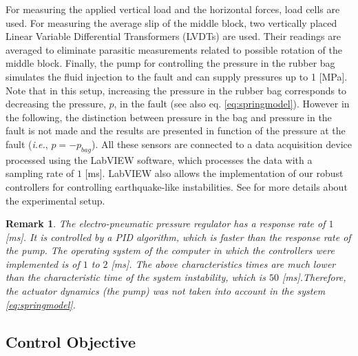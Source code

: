 \documentclass[journal,twoside,web]{ieeecolor}
\newtheorem{remark}{Remark}
\begin{document}
For measuring the applied vertical load and the horizontal forces, load cells are used. For measuring the average slip of the middle block, two vertically placed Linear Variable Differential Transformers (LVDTs) are used. Their readings are averaged to eliminate parasitic measurements related to possible rotation of the middle block. Finally, the pump for controlling the pressure in the rubber bag simulates the fluid injection to the fault and can supply pressures up to 1 [MPa]. Note that in this setup, increasing the pressure in the rubber bag corresponds to decreasing the pressure, $p$, in the fault (see also eq. \eqref{eq:springmodel}). However in the following, the distinction between pressure in the bag and pressure in the fault is not made and the results are presented in function of the pressure at the fault (\textit{i.e.}, $p=-p_{bag}$). All these sensors are connected to a data acquisition device processed using the LabVIEW software, which processes the data with a sampling rate of $1$ [ms]. LabVIEW also allows the implementation of our robust controllers for controlling earthquake-like instabilities. See \cite[Chapter 5]{b:Tzortzopoulos-2021} for more details about the experimental setup.

\begin{remark}
The electro-pneumatic pressure regulator has a response rate of $1$ [ms]. It is controlled by a PID algorithm, which is faster than the response rate of the pump. The operating system of the computer in which the controllers were implemented is of $1$ to $2$ [ms]. The above characteristics times are much lower than the characteristic time of the system instability, which is $50$ [ms].Therefore, the actuator dynamics (the pump) was not taken into account in the system \eqref{eq:springmodel}.
\end{remark}

\subsection{Control Objective}
\end{document}
